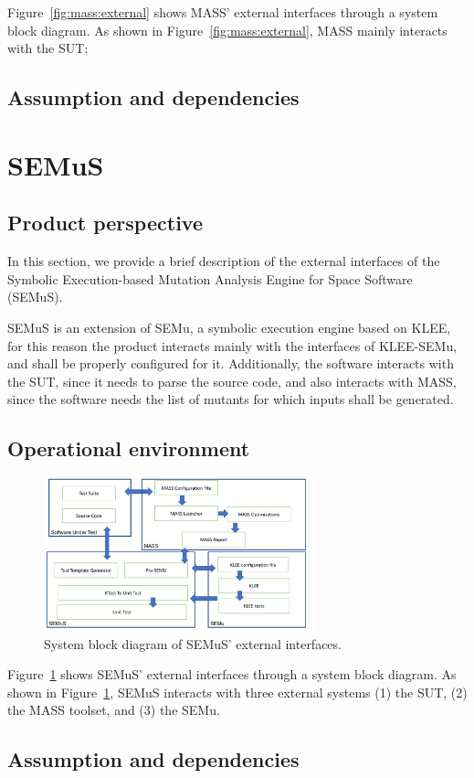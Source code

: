 Figure~\ref{fig:mass:external} shows MASS' external interfaces through a system block diagram.
As shown in Figure~\ref{fig:mass:external}, MASS mainly interacts with the SUT; 



\subsection{Assumption and dependencies}

\section{SEMuS}

\subsection{Product perspective}

In this section, we provide a brief description of the external interfaces of the Symbolic Execution-based Mutation Analysis Engine for Space Software (SEMuS).

SEMuS is an extension of SEMu, a symbolic execution engine based on KLEE, for this reason the product interacts mainly with the interfaces of KLEE-SEMu, and shall be properly configured for it. Additionally, the software interacts with the SUT, since it needs to parse the source code, and also interacts with MASS, since the software needs the list of mutants for which inputs shall be generated.


\subsection{Operational environment}

\begin{figure}[t]
  \centering
  \includegraphics[width=0.7\textwidth]{images/semus-external.pdf}
      \caption{System block diagram of SEMuS' external interfaces.}
      \label{fig:semus:external}
\end{figure}

Figure~\ref{fig:semus:external} shows SEMuS' external interfaces through a system block diagram.
As shown in Figure~\ref{fig:semus:external}, SEMuS interacts with three external systems (1) the SUT, (2) the MASS toolset, and (3) the SEMu.




\subsection{Assumption and dependencies}